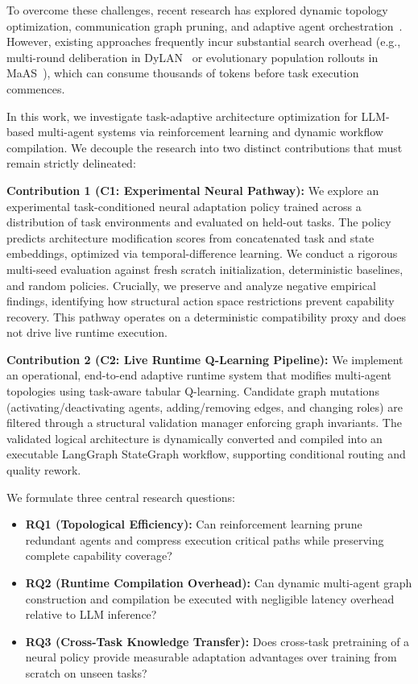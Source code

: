 \documentclass[conference]{IEEEtran}
\begin{document}
To overcome these challenges, recent research has explored dynamic topology optimization, communication graph pruning, and adaptive agent orchestration~\cite{Li2025AdaptiveGraphPruning,Jiang2026GTD,Zhang2025MaAS,wang2026neuralfsm}. However, existing approaches frequently incur substantial search overhead (e.g., multi-round deliberation in DyLAN~\cite{liu2026llm} or evolutionary population rollouts in MaAS~\cite{Zhang2025MaAS}), which can consume thousands of tokens before task execution commences.

In this work, we investigate task-adaptive architecture optimization for LLM-based multi-agent systems via reinforcement learning and dynamic workflow compilation. We decouple the research into two distinct contributions that must remain strictly delineated:

\textbf{Contribution 1 (C1: Experimental Neural Pathway):} We explore an experimental task-conditioned neural adaptation policy trained across a distribution of task environments and evaluated on held-out tasks. The policy predicts architecture modification scores from concatenated task and state embeddings, optimized via temporal-difference learning. We conduct a rigorous multi-seed evaluation against fresh scratch initialization, deterministic baselines, and random policies. Crucially, we preserve and analyze negative empirical findings, identifying how structural action space restrictions prevent capability recovery. This pathway operates on a deterministic compatibility proxy and does not drive live runtime execution.

\textbf{Contribution 2 (C2: Live Runtime Q-Learning Pipeline):} We implement an operational, end-to-end adaptive runtime system that modifies multi-agent topologies using task-aware tabular Q-learning. Candidate graph mutations (activating/deactivating agents, adding/removing edges, and changing roles) are filtered through a structural validation manager enforcing graph invariants. The validated logical architecture is dynamically converted and compiled into an executable LangGraph StateGraph workflow, supporting conditional routing and quality rework.

We formulate three central research questions:
\begin{itemize}[leftmargin=*]
    \item \textbf{RQ1 (Topological Efficiency):} Can reinforcement learning prune redundant agents and compress execution critical paths while preserving complete capability coverage?
    \item \textbf{RQ2 (Runtime Compilation Overhead):} Can dynamic multi-agent graph construction and compilation be executed with negligible latency overhead relative to LLM inference?
    \item \textbf{RQ3 (Cross-Task Knowledge Transfer):} Does cross-task pretraining of a neural policy provide measurable adaptation advantages over training from scratch on unseen tasks?
\end{itemize}
\end{document}
